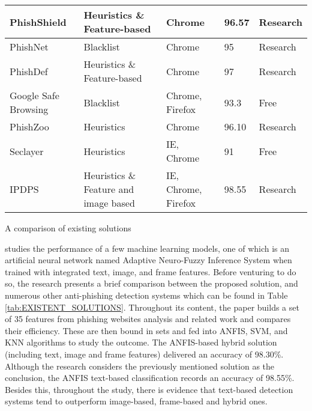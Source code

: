 \begin{singlespace}
\begin{center}
\begin{tabular}{ | m{8em} | m{13em} | m{8.5em} | m{2.3em} | m{5em} | }
			\hline
			PhishShield                  & Heuristics \& Feature-based           & Chrome              & 96.57           & Research               \\
			\hline
			PhishNet                     & Blacklist                             & Chrome              & 95              & Research               \\
			\hline
			PhishDef                     & Heuristics \& Feature-based           & Chrome              & 97              & Research               \\
			\hline
			Google Safe Browsing         & Blacklist                             & Chrome, Firefox     & 93.3            & Free                   \\
			\hline
			PhishZoo                     & Heuristics                            & Chrome              & 96.10           & Research               \\
			\hline
			Seclayer                     & Heuristics                            & IE, Chrome          & 91              & Free                   \\
			\hline
			IPDPS                        & Heuristics \& Feature and image based & IE, Chrome, Firefox & 98.55           & Research               \\
			\hline
		\end{tabular}
		\captionsetup{type=table}\caption{A comparison of existing solutions \citep{INTELLIGENT_PHISHING_ANFIS}}
	\end{center}
\end{singlespace}

\cite{INTELLIGENT_PHISHING_ANFIS} studies the performance of a few machine learning models, one of which is an artificial neural network named Adaptive Neuro-Fuzzy Inference System \citep{ANFIS} when trained with integrated text, image, and frame features. Before venturing to do so, the research presents a brief comparison between the proposed solution, and numerous other anti-phishing detection systems which can be found in Table \ref{tab:EXISTENT_SOLUTIONS}. Throughout its content, the paper builds a set of 35 features from phishing websites analysis and related work and compares their efficiency. These are then bound in sets and fed into ANFIS, SVM, and KNN algorithms to study the outcome. The ANFIS-based hybrid solution (including text, image and frame features) delivered an accuracy of 98.30\%. Although the research considers the previously mentioned solution as the conclusion, the ANFIS text-based classification records an accuracy of 98.55\%. Besides this, throughout the study, there is evidence that text-based detection systems tend to outperform image-based, frame-based and hybrid ones.

